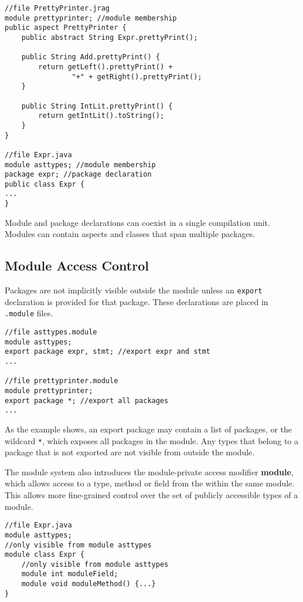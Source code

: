 \begin{lstlisting}[caption={Module Membership}]
//file PrettyPrinter.jrag
module prettyprinter; //module membership
public aspect PrettyPrinter {
	public abstract String Expr.prettyPrint();
	
	public String Add.prettyPrint() {
		return getLeft().prettyPrint() + 
				"+" + getRight().prettyPrint();
	}
	
	public String IntLit.prettyPrint() {
		return getIntLit().toString();
	}
}

//file Expr.java
module asttypes; //module membership
package expr; //package declaration
public class Expr {
...
}
\end{lstlisting}

Module and package declarations can coexist in a single compilation unit.
Modules can contain aspects and classes that span multiple packages.

\subsection{Module Access Control}

Packages are not implicitly visible outside the module unless an
\texttt{export} declaration is provided for that package. These declarations
are placed in \texttt{.module} files.

\begin{lstlisting}[caption={Export Package}]
//file asttypes.module
module asttypes;
export package expr, stmt; //export expr and stmt
...

//file prettyprinter.module
module prettyprinter;
export package *; //export all packages
...
\end{lstlisting}

As the example shows, an export package may contain a list of packages, or the
wildcard \texttt{*}, which exposes all packages in the module. Any types that
belong to a package that is not exported are not visible from outside the module.

The module system also introduces the module-private access modifier \textbf{module},
which allows access to a type, method or field from the within the same module. This
allows more fine-grained control over the set of publicly accessible types of a module.

\begin{lstlisting}
//file Expr.java
module asttypes;
//only visible from module asttypes
module class Expr {
	//only visible from module asttypes
	module int moduleField;
	module void moduleMethod() {...}
}
\end{lstlisting}

